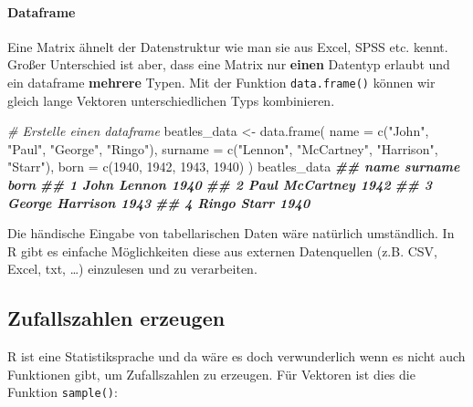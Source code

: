 \documentclass[
]{article}
\newenvironment{Shaded}{\begin{snugshade}}{\end{snugshade}}
\newcommand{\AttributeTok}[1]{\textcolor[rgb]{0.77,0.63,0.00}{#1}}
\newcommand{\CommentTok}[1]{\textcolor[rgb]{0.56,0.35,0.01}{\textit{#1}}}
\newcommand{\DecValTok}[1]{\textcolor[rgb]{0.00,0.00,0.81}{#1}}
\newcommand{\DocumentationTok}[1]{\textcolor[rgb]{0.56,0.35,0.01}{\textbf{\textit{#1}}}}
\newcommand{\FunctionTok}[1]{\textcolor[rgb]{0.00,0.00,0.00}{#1}}
\newcommand{\NormalTok}[1]{#1}
\newcommand{\OtherTok}[1]{\textcolor[rgb]{0.56,0.35,0.01}{#1}}
\newcommand{\StringTok}[1]{\textcolor[rgb]{0.31,0.60,0.02}{#1}}
\begin{document}
\hypertarget{dataframe}{%
\paragraph{Dataframe}\label{dataframe}}

Eine Matrix ähnelt der Datenstruktur wie man sie aus Excel, SPSS etc. kennt. Großer Unterschied ist aber, dass eine Matrix nur \textbf{einen} Datentyp erlaubt und ein dataframe \textbf{mehrere} Typen. Mit der Funktion \texttt{data.frame()} können wir gleich lange Vektoren unterschiedlichen Typs kombinieren.

\begin{Shaded}
\begin{Highlighting}[]
\CommentTok{\# Erstelle einen dataframe}
\NormalTok{beatles\_data }\OtherTok{\textless{}{-}} \FunctionTok{data.frame}\NormalTok{(}
  \AttributeTok{name =} \FunctionTok{c}\NormalTok{(}\StringTok{"John"}\NormalTok{, }\StringTok{"Paul"}\NormalTok{, }\StringTok{"George"}\NormalTok{, }\StringTok{"Ringo"}\NormalTok{),}
  \AttributeTok{surname =} \FunctionTok{c}\NormalTok{(}\StringTok{"Lennon"}\NormalTok{, }\StringTok{"McCartney"}\NormalTok{, }\StringTok{"Harrison"}\NormalTok{, }\StringTok{"Starr"}\NormalTok{),}
  \AttributeTok{born =} \FunctionTok{c}\NormalTok{(}\DecValTok{1940}\NormalTok{, }\DecValTok{1942}\NormalTok{, }\DecValTok{1943}\NormalTok{, }\DecValTok{1940}\NormalTok{)}
\NormalTok{)}
\NormalTok{beatles\_data}
\DocumentationTok{\#\#     name   surname born}
\DocumentationTok{\#\# 1   John    Lennon 1940}
\DocumentationTok{\#\# 2   Paul McCartney 1942}
\DocumentationTok{\#\# 3 George  Harrison 1943}
\DocumentationTok{\#\# 4  Ringo     Starr 1940}
\end{Highlighting}
\end{Shaded}

Die händische Eingabe von tabellarischen Daten wäre natürlich umständlich. In R gibt es einfache Möglichkeiten diese aus externen Datenquellen (z.B. CSV, Excel, txt, \ldots) einzulesen und zu verarbeiten.

\hypertarget{zufallszahlen-erzeugen}{%
\subsection{Zufallszahlen erzeugen}\label{zufallszahlen-erzeugen}}

R ist eine Statistiksprache und da wäre es doch verwunderlich wenn es nicht auch Funktionen gibt, um Zufallszahlen zu erzeugen. Für Vektoren ist dies die Funktion \texttt{sample()}:
\end{document}
